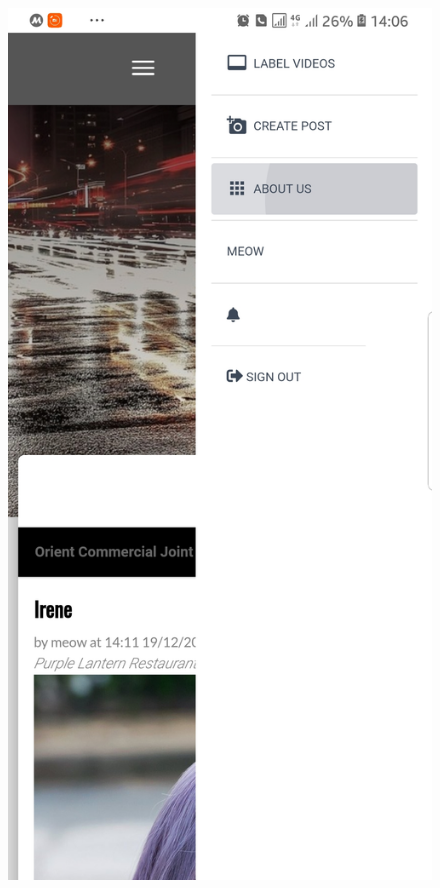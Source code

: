 \begin{figure}[!htb]
  \includegraphics[width=\linewidth]{images/chap4/header_mb.jpg}
\endminipage\hfill
{}

\end{figure}
